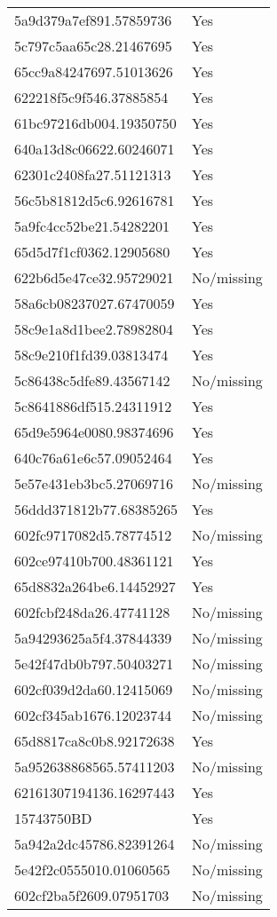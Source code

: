 \begin{tabular}{ll}
5a9d379a7ef891.57859736 & Yes \\
5c797c5aa65c28.21467695 & Yes \\
65cc9a84247697.51013626 & Yes \\
622218f5c9f546.37885854 & Yes \\
61bc97216db004.19350750 & Yes \\
640a13d8c06622.60246071 & Yes \\
62301c2408fa27.51121313 & Yes \\
56c5b81812d5c6.92616781 & Yes \\
5a9fc4cc52be21.54282201 & Yes \\
65d5d7f1cf0362.12905680 & Yes \\
622b6d5e47ce32.95729021 & No/missing \\
58a6cb08237027.67470059 & Yes \\
58c9e1a8d1bee2.78982804 & Yes \\
58c9e210f1fd39.03813474 & Yes \\
5c86438c5dfe89.43567142 & No/missing \\
5c8641886df515.24311912 & Yes \\
65d9e5964e0080.98374696 & Yes \\
640c76a61e6c57.09052464 & Yes \\
5e57e431eb3bc5.27069716 & No/missing \\
56ddd371812b77.68385265 & Yes \\
602fc9717082d5.78774512 & No/missing \\
602ce97410b700.48361121 & Yes \\
65d8832a264be6.14452927 & Yes \\
602fcbf248da26.47741128 & No/missing \\
5a94293625a5f4.37844339 & No/missing \\
5e42f47db0b797.50403271 & No/missing \\
602cf039d2da60.12415069 & No/missing \\
602cf345ab1676.12023744 & No/missing \\
65d8817ca8c0b8.92172638 & Yes \\
5a952638868565.57411203 & No/missing \\
62161307194136.16297443 & Yes \\
15743750BD & Yes \\
5a942a2dc45786.82391264 & No/missing \\
5e42f2c0555010.01060565 & No/missing \\
602cf2ba5f2609.07951703 & No/missing \\

\end{tabular}
